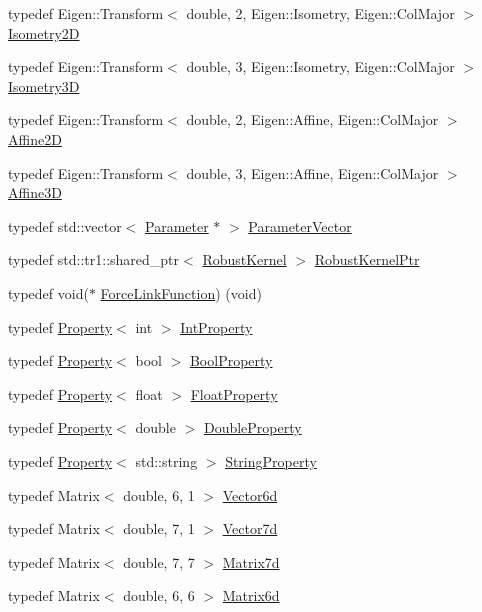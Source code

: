 \begin{DoxyCompactItemize}
\item 
typedef Eigen\+::\+Transform$<$ double, 2, Eigen\+::\+Isometry, Eigen\+::\+Col\+Major $>$ \mbox{\hyperlink{namespaceg2o_a24614fc78fff981b779fbf4850b19101}{Isometry2D}}
\item 
typedef Eigen\+::\+Transform$<$ double, 3, Eigen\+::\+Isometry, Eigen\+::\+Col\+Major $>$ \mbox{\hyperlink{namespaceg2o_af8f6c8f7db82618f6bab6bbe448806eb}{Isometry3D}}
\item 
typedef Eigen\+::\+Transform$<$ double, 2, Eigen\+::\+Affine, Eigen\+::\+Col\+Major $>$ \mbox{\hyperlink{namespaceg2o_ad7410532a9e2e255e93781c6beb0feb8}{Affine2D}}
\item 
typedef Eigen\+::\+Transform$<$ double, 3, Eigen\+::\+Affine, Eigen\+::\+Col\+Major $>$ \mbox{\hyperlink{namespaceg2o_ab3cae84956b78f00b9091c56c42af5eb}{Affine3D}}
\item 
typedef std\+::vector$<$ \mbox{\hyperlink{classg2o_1_1_parameter}{Parameter}} $\ast$ $>$ \mbox{\hyperlink{namespaceg2o_a85cc8f2c7db8cab47b2b269a7acd6785}{Parameter\+Vector}}
\item 
typedef std\+::tr1\+::shared\+\_\+ptr$<$ \mbox{\hyperlink{classg2o_1_1_robust_kernel}{Robust\+Kernel}} $>$ \mbox{\hyperlink{namespaceg2o_a0802a5e01a6b1861ae01013220dec6ac}{Robust\+Kernel\+Ptr}}
\item 
typedef void($\ast$ \mbox{\hyperlink{namespaceg2o_a3be76fea59d320255e89425439f18f48}{Force\+Link\+Function}}) (void)
\item 
typedef \mbox{\hyperlink{classg2o_1_1_property}{Property}}$<$ int $>$ \mbox{\hyperlink{namespaceg2o_aa44e64803eabdb592175e27f1e3ebf59}{Int\+Property}}
\item 
typedef \mbox{\hyperlink{classg2o_1_1_property}{Property}}$<$ bool $>$ \mbox{\hyperlink{namespaceg2o_a28e624fedcafeb2b049be2930421071f}{Bool\+Property}}
\item 
typedef \mbox{\hyperlink{classg2o_1_1_property}{Property}}$<$ float $>$ \mbox{\hyperlink{namespaceg2o_af8e55b06b00e915fcf0475b00acea270}{Float\+Property}}
\item 
typedef \mbox{\hyperlink{classg2o_1_1_property}{Property}}$<$ double $>$ \mbox{\hyperlink{namespaceg2o_a9b4e25cbdaf9d69afa4431d6af6d7bed}{Double\+Property}}
\item 
typedef \mbox{\hyperlink{classg2o_1_1_property}{Property}}$<$ std\+::string $>$ \mbox{\hyperlink{namespaceg2o_a40c5b0f5bf1dd1e5b9c25c20fcf43920}{String\+Property}}
\item 
typedef Matrix$<$ double, 6, 1 $>$ \mbox{\hyperlink{namespaceg2o_a3bc8a4fbac86f158d548be81af2f929b}{Vector6d}}
\item 
typedef Matrix$<$ double, 7, 1 $>$ \mbox{\hyperlink{namespaceg2o_a4740ec41130f2ecc628c81f71261c8de}{Vector7d}}
\item 
typedef Matrix$<$ double, 7, 7 $>$ \mbox{\hyperlink{namespaceg2o_a3ce3dfdcb313ec3483b8cee099402e54}{Matrix7d}}
\item 
typedef Matrix$<$ double, 6, 6 $>$ \mbox{\hyperlink{namespaceg2o_afff8bcc18e5be58eef0961900ddda24b}{Matrix6d}}
\end{DoxyCompactItemize}
